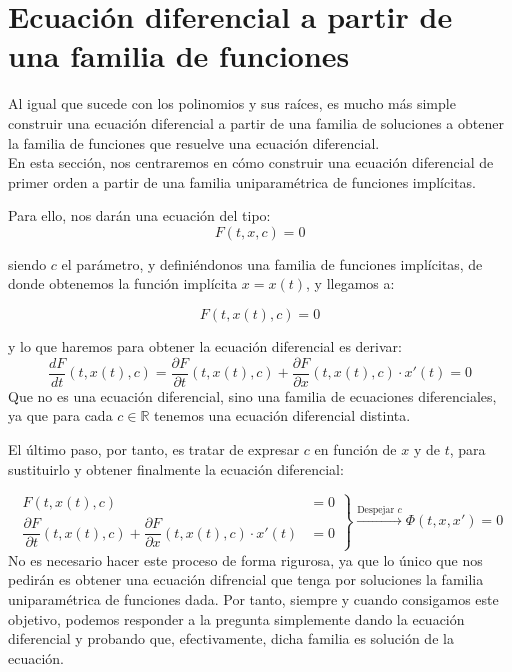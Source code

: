 \section{Ecuación diferencial a partir de una familia de funciones}
Al igual que sucede con los polinomios y sus raíces, es mucho más simple construir una ecuación diferencial a partir de una familia de soluciones a obtener la familia de funciones que resuelve una ecuación diferencial.\\

En esta sección, nos centraremos en cómo construir una ecuación diferencial de primer orden a partir de una familia uniparamétrica de funciones implícitas.

Para ello, nos darán una ecuación del tipo:
\begin{equation*}
    F(t,x,c) = 0
\end{equation*}

siendo $c$ el parámetro, y definiéndonos una familia de funciones implícitas, de donde obtenemos la función implícita $x=x(t)$, y llegamos a:

\begin{equation*}
    F(t,x(t),c) = 0
\end{equation*}

y lo que haremos para obtener la ecuación diferencial es derivar:
\begin{equation*}
    \dfrac{dF}{dt}(t,x(t),c) = \dfrac{\partial F}{\partial t}(t,x(t),c) + \dfrac{\partial F}{\partial x}(t,x(t),c)\cdot x'(t) = 0
\end{equation*}
Que no es una ecuación diferencial, sino una familia de ecuaciones diferenciales, ya que para cada $c\in \mathbb{R}$ tenemos una ecuación diferencial distinta.

El último paso, por tanto, es tratar de expresar $c$ en función de $x$ y de $t$, para sustituirlo y obtener finalmente la ecuación diferencial:

\begin{equation*}
    \left.\begin{array}{rr}
                F(t,x(t),c) &= 0 \\
                \dfrac{\partial F}{\partial t}(t,x(t),c) + \dfrac{\partial F}{\partial x}(t,x(t),c)\cdot x'(t) &= 0
        \end{array}\right\} \overset{\text{Despejar $c$}}{\longrightarrow } \Phi(t,x,x') = 0
\end{equation*}
No es necesario hacer este proceso de forma rigurosa, ya que lo único que nos pedirán es obtener una ecuación difrencial que tenga por soluciones la familia uniparamétrica de funciones dada. Por tanto, siempre y cuando consigamos este objetivo, podemos responder a la pregunta simplemente dando la ecuación diferencial y probando que, efectivamente, dicha familia es solución de la ecuación.

